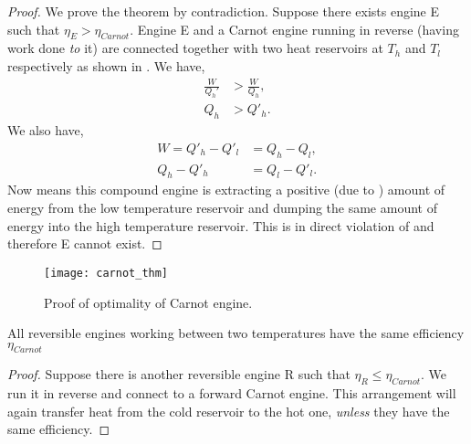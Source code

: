 \begin{proof}
We prove the theorem by contradiction. 
Suppose there exists engine E such that $\eta_E>\eta_{Carnot}$. 
Engine E and a Carnot engine running in reverse (having work done \textit{to} it) are connected together with two heat reservoirs at $T_h$ and $T_l$ respectively as shown in . 
We have, 
\begin{equation}
\label{carnot_0}
\begin{aligned}
\frac{W}{Q_h'}&>\frac{W}{Q_h}, \\
Q_h&>Q'_h. 
\end{aligned}
\end{equation}
We also have, 
\begin{equation}
\label{eq:carnot_thm}
\begin{aligned}
W=Q'_h-Q'_l&=Q_h-Q_l, \\
Q_h-Q'_h&=Q_l-Q'_l. 
\end{aligned}
\end{equation}
Now  means this compound engine is extracting a positive (due to ) amount of energy from the low temperature reservoir and dumping the same amount of energy into the high temperature reservoir. 
This is in direct violation of  and therefore E cannot exist. 
\end{proof}

\begin{figure}[!htbp]
	\texttt{[image: carnot\_thm]}
	\centering
	\caption{Proof of optimality of Carnot engine.}
	\label{fig:carnot_thm}
\end{figure}

\begin{coro}
All reversible engines working between two temperatures have the same efficiency $\eta_{Carnot}$
\end{coro}
\begin{proof}
Suppose there is another reversible engine R such that $\eta_R\leq\eta_{Carnot}$. We run it in reverse and connect to a forward Carnot engine. This arrangement will again transfer heat from the cold reservoir to the hot one, \textit{unless} they have the same efficiency. 
\end{proof}

